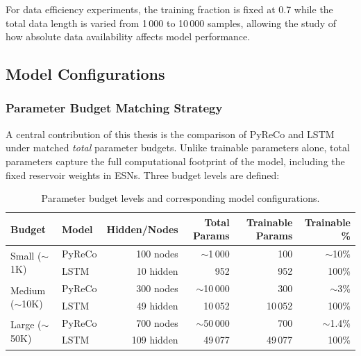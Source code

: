 For data efficiency experiments, the training fraction is fixed at 0.7 while the total data length is varied from 1\,000 to 10\,000 samples, allowing the study of how absolute data availability affects model performance.

\subsection{Model Configurations}
\label{sec:model_config}

\subsubsection{Parameter Budget Matching Strategy}
\label{sec:budget_matching}

A central contribution of this thesis is the comparison of PyReCo and LSTM under matched \emph{total} parameter budgets. Unlike trainable parameters alone, total parameters capture the full computational footprint of the model, including the fixed reservoir weights in ESNs. Three budget levels are defined:

\begin{table}[H]
\centering
\caption{Parameter budget levels and corresponding model configurations.}
\label{tab:budgets}
\begin{tabular}{@{}llrrrr@{}}
\toprule
Budget & Model & Hidden/Nodes & Total Params & Trainable Params & Trainable \% \\
\midrule
\multirow{2}{*}{Small (${\sim}$1K)}
    & PyReCo & 100 nodes & ${\sim}$1\,000 & 100 & ${\sim}$10\% \\
    & LSTM   & 10 hidden & 952 & 952 & 100\% \\
\midrule
\multirow{2}{*}{Medium (${\sim}$10K)}
    & PyReCo & 300 nodes & ${\sim}$10\,000 & 300 & ${\sim}$3\% \\
    & LSTM   & 49 hidden & 10\,052 & 10\,052 & 100\% \\
\midrule
\multirow{2}{*}{Large (${\sim}$50K)}
    & PyReCo & 700 nodes & ${\sim}$50\,000 & 700 & ${\sim}$1.4\% \\
    & LSTM   & 109 hidden & 49\,077 & 49\,077 & 100\% \\
\bottomrule
\end{tabular}
\end{table}

